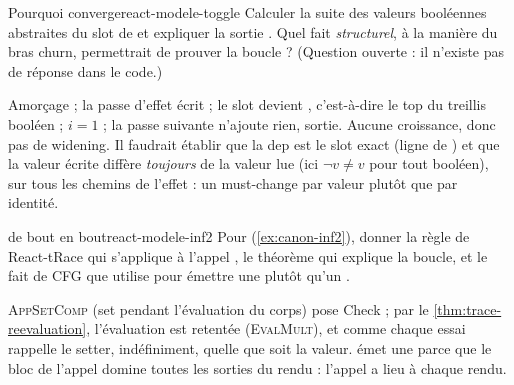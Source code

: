 \begin{exercice}{Pourquoi  converge}{react-modele-toggle}
Calculer la suite des valeurs booléennes abstraites du slot  de
 et expliquer la sortie . Quel
fait \emph{structurel}, à la manière du bras churn, permettrait de prouver la
boucle ? (Question ouverte : il n'existe pas de réponse dans le code.)
\end{exercice}
\begin{solution}
Amorçage  ; la passe d'effet écrit  ; le slot
devient , c'est-à-dire le top du treillis booléen ;
$i = 1$ ; la passe suivante n'ajoute rien, sortie. Aucune croissance, donc pas
de widening. Il faudrait établir que la dep est le slot exact (ligne
 de ) et que la valeur écrite diffère
\emph{toujours} de la valeur lue (ici $\lnot v \neq v$ pour tout booléen), sur
tous les chemins de l'effet : un must-change par valeur plutôt que par identité.
\end{solution}

\begin{exercice}{ de bout en bout}{react-modele-inf2}
Pour  (\cref{ex:canon-inf2}), donner la règle de React-tRace
qui s'applique à l'appel , le théorème qui explique la
boucle, et le fait de CFG que  utilise pour émettre une
\Error{} plutôt qu'un \Warning.
\end{exercice}
\begin{solution}
\textsc{AppSetComp} (set pendant l'évaluation du corps) pose \textsf{Check} ;
par le \cref{thm:trace-reevaluation}, l'évaluation est retentée
(\textsc{EvalMult}), et comme chaque essai rappelle le setter, indéfiniment,
quelle que soit la valeur.  émet une \Error{} parce
que le bloc de l'appel domine toutes les sorties du rendu : l'appel a lieu à
chaque rendu.
\end{solution}

